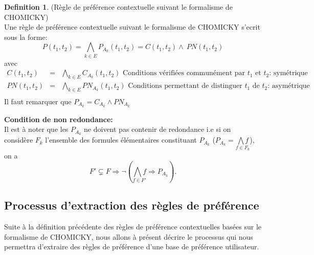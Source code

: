 \documentclass[11pt,a4paper]{article}
\theoremstyle{definition}
\newtheorem{defn}{Definition} %
\begin{document}
	\begin{defn}(Règle de préférence contextuelle suivant le formalisme de CHOMICKY)\\
	Une règle de préférence contextuelle suivant le formalisme de CHOMICKY s'ecrit sous la forme:
	\[
		P(t_{1},t_{2})=\underset{k\in E}{\bigwedge} P_{A_{k}}(t_{1},t_{2})=C(t_{1},t_{2})\wedge\ PN(t_{1},t_{2})
	\]
	avec
	\[
	\begin{array}{rcl}
			C(t_{1},t_{2})&=&\underset{k\in E}{\bigwedge} C_{A_{k}}(t_{1},t_{2}) \text{ Conditions vérifiées communément par $t_1$ et $t_2$: symétrique}\\
			PN(t_{1},t_{2})&=&\underset{k\in E}{\bigwedge} PN_{A_{k}}(t_{1},t_{2})\text{ Conditions permettant de distinguer $t_1$ de $t_2$: asymétrique}\\
	\end{array}
	\]
	Il faut remarquer que $P_{A_{k}}= C_{A_{k}}\wedge PN_{A_{k}}$
	\end{defn}
			    


      	\textbf{Condition de non redondance:}\\
      	Il est à noter que les $P_{A_{k}}$ ne doivent pas contenir de redondance i.e si on considère $F_{k}$ l'ensemble des formules élémentaires constituant $P_{A_{k}}$ ($P_{A_{k}}=\underset{f\in F_{k}}{\bigwedge f}$), on a 
      	\[
      	 F'\subsetneq F\Rightarrow \neg (\underset{f\in F'}{\bigwedge f}\Rightarrow P_{A_{k}}).
      	\]
      	
      
       
    \subsection{Processus d'extraction des règles de préférence}
    Suite à la définition précédente des règles de préférence contextuelles basées sur le formalisme de CHOMICKY, nous allons à présent décrire le processus qui nous permettra d'extraire des règles de préférence d'une base de préférence utilisateur. \\
    
\end{document}
